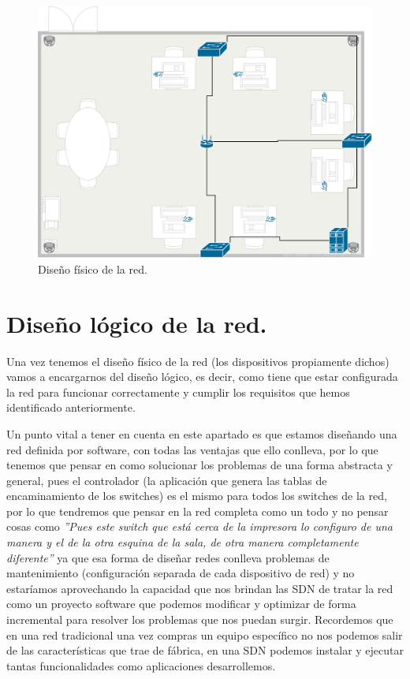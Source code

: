 \begin{figure}[!h]
    \centering
    \includegraphics[width=\textwidth]{imagenes/figuras/requisitos_red_con_plano.pdf}
    \caption{Diseño físico de la red.}
    \label{fig:diseño_fisico}
\end{figure}

\section{Diseño lógico de la red.}

Una vez tenemos el diseño físico de la red (los dispositivos propiamente dichos) vamos a encargarnos del diseño lógico, es decir, como tiene que estar configurada la red para funcionar correctamente y cumplir los requisitos que hemos identificado anteriormente.

Un punto vital a tener en cuenta en este apartado es que estamos diseñando una red definida por software, con todas las ventajas que ello conlleva, por lo que tenemos que pensar en como solucionar los problemas de una forma abstracta y general, pues el controlador (la aplicación que genera las tablas de encaminamiento de los switches) es el mismo para todos los switches de la red, por lo que tendremos que pensar en la red completa como un todo y no pensar cosas como \emph{''Pues este switch que está cerca de la impresora lo configuro de una manera y el de la otra esquina de la sala, de otra manera completamente diferente''} ya que esa forma de diseñar redes conlleva problemas de mantenimiento (configuración separada de cada dispositivo de red) y no estaríamos aprovechando la capacidad que nos brindan las SDN de tratar la red como un proyecto software que podemos modificar y optimizar de forma incremental para resolver los problemas que nos puedan surgir. Recordemos que en una red tradicional una vez compras un equipo específico no nos podemos salir de las características que trae de fábrica, en una SDN podemos instalar y ejecutar tantas funcionalidades como aplicaciones desarrollemos.

